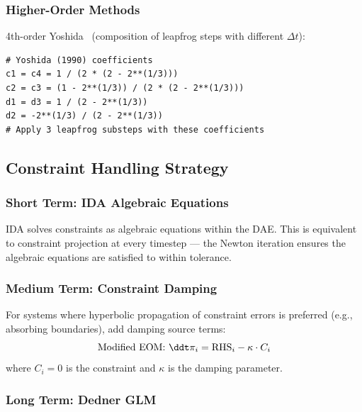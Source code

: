 \subsubsection{Higher-Order Methods}
\label{sec:higher-order}

4th-order Yoshida~\cite{yoshida1990symplectic} (composition of leapfrog steps with different $\Delta t$):

\begin{lstlisting}[style=python]
# Yoshida (1990) coefficients
c1 = c4 = 1 / (2 * (2 - 2**(1/3)))
c2 = c3 = (1 - 2**(1/3)) / (2 * (2 - 2**(1/3)))
d1 = d3 = 1 / (2 - 2**(1/3))
d2 = -2**(1/3) / (2 - 2**(1/3))
# Apply 3 leapfrog substeps with these coefficients
\end{lstlisting}

\subsection{Constraint Handling Strategy}
\label{sec:constraint-handling}

\subsubsection{Short Term: IDA Algebraic Equations}
\label{sec:constraint-ida}

IDA solves constraints as algebraic equations within the DAE. This is equivalent
to constraint projection at every timestep --- the Newton iteration ensures the
algebraic equations are satisfied to within tolerance.

\subsubsection{Medium Term: Constraint Damping}
\label{sec:constraint-damping}

For systems where hyperbolic propagation of constraint errors is preferred
(e.g., absorbing boundaries), add damping source terms:
\begin{equation}
  \text{Modified EOM: } \ddt \pi_i = \mathrm{RHS}_i - \kappa \cdot C_i
  \label{eq:constraint-damping}
\end{equation}
where $C_i = 0$ is the constraint and $\kappa$ is the damping parameter.

\subsubsection{Long Term: Dedner GLM}
\label{sec:dedner-glm}

